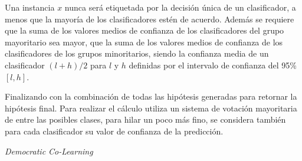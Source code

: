 Una instancia $x$ nunca será etiquetada por la decisión única de un clasificador, a menos que la mayoría de los clasificadores estén de acuerdo. Además se requiere que la suma de los valores medios de confianza de los clasificadores del grupo mayoritario sea mayor, que la suma de los valores medios de confianza de los clasificadores de los grupos minoritarios, siendo la confianza media de un clasificador $ (l + h)/2
$ para $l$ y $h$ definidas por el intervalo de confianza del 95\% $\left[l,h\right]$.

Finalizando con la combinación de todas las hipótesis generadas para retornar la hipótesis final. Para realizar el cálculo utiliza un sistema de votación mayoritaria de entre las posibles clases, para hilar un poco más fino, se considera también para cada clasificador su valor de confianza de la predicción. 

\begin{algorithm}[H]
  	\BlankLine
	\AlgoSaveLineCount
	\caption{\textit{Democratic Co-Learning}}\label{alg:Democratic-Co}
\end{algorithm}

